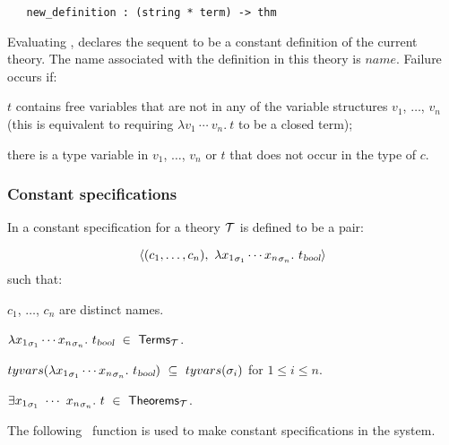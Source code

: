 \begin{holboxed}
\begin{verbatim}
   new_definition : (string * term) -> thm
\end{verbatim}
\end{holboxed}


\noindent Evaluating
 ,
declares the sequent
 to be a constant definition
of the current theory. The name associated with the definition in
this theory is $name$.
Failure occurs if:
\begin{myenumerate}
\item $t$ contains free variables that are not in any of
the variable structures $v_1$, $\dots$, $v_n$ (this is equivalent
to requiring $\lambda v_1\ \cdots\ v_n.\  t$ to be a closed term);
\item there is a type variable in  $v_1$, $\dots$, $v_n$ or $t$
that does not occur in the type of $c$.
\end{myenumerate}

\subsubsection{Constant specifications}
\label{conspec}

%
%
In \LOGIC{} a constant specification for a theory ${\cal T}$
is defined to be a pair:

\[
\langle(c_1,\ldots,c_n),\ \lquant{{x_1}_{\sigma_1}
\cdots {x_n}_{\sigma_n}}t_{\ty{bool}}\rangle
\]
such that:

\begin{myenumerate}
\item $c_1$, $\dots$, $c_n$ are distinct names.
\item $\lambda {x_1}_{\sigma_1}
\cdots {x_n}_{\sigma_n}.\ t_{\textsl{bool}}\ \in\ {\sf Terms}_{\cal T}$.
\item $tyvars(\lquant{{x_1}_{\sigma_1}
\cdots {x_n}_{\sigma_n}}t_{\ty{bool}})\ \subseteq\ tyvars(\sigma_i)$ for
$1\leq i\leq n$.
\item $\equant{{x_1}_{\sigma_1}\ \cdots\ {x_n}_{\sigma_n}}t
\ \in\ {\sf Theorems}_{\cal T}$.
\end{myenumerate}
The following \ML\ function is used to make constant specifications in
the \HOL{} system.

